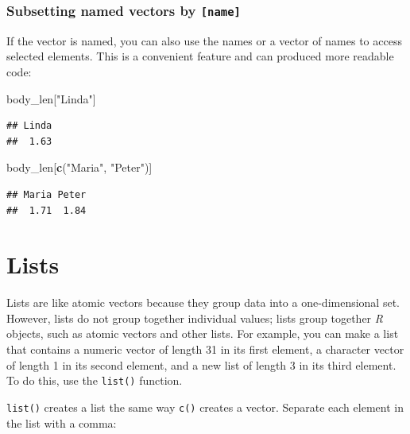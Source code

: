 \documentclass[
]{scrartcl}
\newenvironment{Shaded}{\begin{snugshade}}{\end{snugshade}}
\newcommand{\KeywordTok}[1]{\textcolor[rgb]{0.13,0.29,0.53}{\textbf{#1}}}
\newcommand{\NormalTok}[1]{#1}
\newcommand{\StringTok}[1]{\textcolor[rgb]{0.31,0.60,0.02}{#1}}
\begin{document}
\hypertarget{subsetting-named-vectors-by-name}{%
\subsubsection{\texorpdfstring{Subsetting named vectors by \texttt{{[}name{]}}}{Subsetting named vectors by {[}name{]}}}\label{subsetting-named-vectors-by-name}}

If the vector is named, you can also use the names or a vector of names to access selected elements. This is a convenient feature and can produced more readable code:

\begin{Shaded}
\begin{Highlighting}[]
\NormalTok{body\_len[}\StringTok{"Linda"}\NormalTok{]}
\end{Highlighting}
\end{Shaded}

\begin{verbatim}
## Linda 
##  1.63
\end{verbatim}

\begin{Shaded}
\begin{Highlighting}[]
\NormalTok{body\_len[}\KeywordTok{c}\NormalTok{(}\StringTok{"Maria"}\NormalTok{, }\StringTok{"Peter"}\NormalTok{)]}
\end{Highlighting}
\end{Shaded}

\begin{verbatim}
## Maria Peter 
##  1.71  1.84
\end{verbatim}

\hypertarget{lists}{%
\section{Lists}\label{lists}}

Lists are like atomic vectors because they group data into a one-dimensional set. However, lists do not group together individual values; lists group together \emph{R} objects, such as atomic vectors and other lists. For example, you can make a list that contains a numeric vector of length 31 in its first element, a character vector of length 1 in its second element, and a new list of length 3 in its third element. To do this, use the \texttt{list()} function.

\texttt{list()} creates a list the same way \texttt{c()} creates a vector. Separate each element in the list with a comma:
\end{document}
